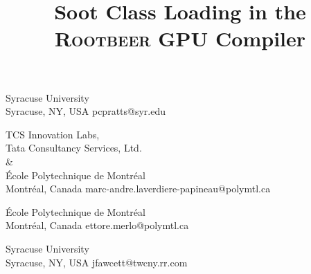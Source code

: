 \documentclass[preprint]{sigplanconf}
\begin{document}
\newcommand*{\rb}{\textsc{Rootbeer}\xspace}
\newcommand*{\sootclass}{\texttt{SootClass}\xspace}
\newcommand*{\sootmethod}{\texttt{SootMethod}\xspace}
\newcommand*{\sootfield}{\texttt{SootField}\xspace}

\lstset{
  basicstyle=\footnotesize\tt,        %
  breakatwhitespace=false,         %
  breaklines=true,                 %
  captionpos=b,                    %
  extendedchars=true,              %
  frame=single,                    %
  language=Java,                 %
  keywordstyle=\bf,
  showspaces=false,                %
  showstringspaces=false,          %
  showtabs=false,                  %
  tabsize=2                       %
}

\copyrightdata{[to be supplied]} 

\title{Soot Class Loading in the \rb GPU Compiler}

           {Syracuse University\\Syracuse, NY, USA}
           {pcpratts@syr.edu}

           {TCS Innovation Labs,\\Tata Consultancy Services, Ltd.\\\&\\
			École Polytechnique de Montréal\\
			Montréal, Canada}
           {marc-andre.laverdiere-papineau@polymtl.ca}

          
           
           {École Polytechnique de Montréal\\
			Montréal, Canada}
           {ettore.merlo@polymtl.ca}           
           
           {Syracuse University\\Syracuse, NY, USA}
           {jfawcett@twcny.rr.com}        
 
\end{document}
